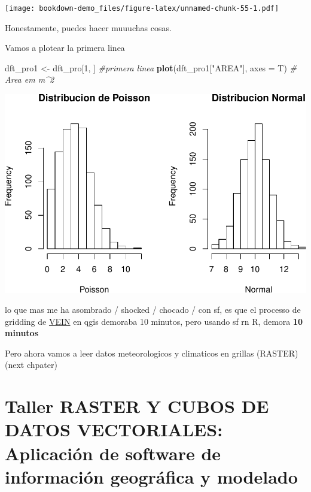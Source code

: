\documentclass[]{book}
\newenvironment{Shaded}{\begin{snugshade}}{\end{snugshade}}
\newcommand{\CommentTok}[1]{\textcolor[rgb]{0.56,0.35,0.01}{\textit{#1}}}
\newcommand{\DataTypeTok}[1]{\textcolor[rgb]{0.13,0.29,0.53}{#1}}
\newcommand{\DecValTok}[1]{\textcolor[rgb]{0.00,0.00,0.81}{#1}}
\newcommand{\KeywordTok}[1]{\textcolor[rgb]{0.13,0.29,0.53}{\textbf{#1}}}
\newcommand{\NormalTok}[1]{#1}
\newcommand{\StringTok}[1]{\textcolor[rgb]{0.31,0.60,0.02}{#1}}
\begin{document}
\texttt{[image: bookdown-demo\_files/figure-latex/unnamed-chunk-55-1.pdf]}

Honestamente, puedes hacer muuuchas cosas.

Vamos a plotear la primera linea

\begin{Shaded}
\begin{Highlighting}[]
\NormalTok{dft_pro1 <-}\StringTok{ }\NormalTok{dft_pro[}\DecValTok{1}\NormalTok{, ] }\CommentTok{#primera linea}
\KeywordTok{plot}\NormalTok{(dft_pro1[}\StringTok{"AREA"}\NormalTok{], }\DataTypeTok{axes =}\NormalTok{ T) }\CommentTok{# Area em m^2}
\end{Highlighting}
\end{Shaded}

\includegraphics{bookdown-demo_files/figure-latex/unnamed-chunk-56-1.pdf}

lo que mas me ha asombrado / shocked / chocado / con sf, es que el processo de gridding de \href{https://rdrr.io/cran/vein/man/emis_grid.html}{VEIN} en qgis demoraba 10 minutos, pero usando sf rn R, demora \textbf{10 minutos}

Pero ahora vamos a leer datos meteorologicos y climaticos en grillas (RASTER)
(next chpater)

\hypertarget{taller-raster-y-cubos-de-datos-vectoriales-aplicacion-de-software-de-informacion-geografica-y-modelado}{%
\chapter{Taller RASTER Y CUBOS DE DATOS VECTORIALES: Aplicación de software de información geográfica y modelado}\label{taller-raster-y-cubos-de-datos-vectoriales-aplicacion-de-software-de-informacion-geografica-y-modelado}}
\end{document}
